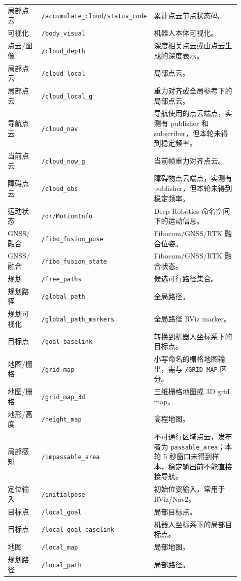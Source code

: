 \documentclass[UTF8,11pt,a4paper]{ctexart}
\begin{document}
{\begin{longtable}{p{0.17\linewidth}p{0.31\linewidth}p{0.43\linewidth}}
局部点云 & \texttt{/accumulate\_cloud/status\_code} & 累计点云节点状态码。\\
可视化 & \texttt{/body\_visual} & 机器人本体可视化。\\
点云/图像 & \texttt{/cloud\_depth} & 深度相关点云或由点云生成的深度表示。\\
局部点云 & \texttt{/cloud\_local} & 局部点云。\\
局部点云 & \texttt{/cloud\_local\_g} & 重力对齐或全局参考下的局部点云。\\
导航点云 & \texttt{/cloud\_nav} & 导航使用的点云端点，实测有 publisher 和 subscriber，但本轮未得到稳定频率。\\
当前点云 & \texttt{/cloud\_now\_g} & 当前帧重力对齐点云。\\
障碍点云 & \texttt{/cloud\_obs} & 障碍物点云端点，实测有 publisher，但本轮未得到稳定频率。\\
运动状态 & \texttt{/dr/MotionInfo} & Deep Robotics 命名空间下的运动信息。\\
GNSS/融合 & \texttt{/fibo\_fusion\_pose} & Fibocom/GNSS/RTK 融合位姿。\\
GNSS/融合 & \texttt{/fibo\_fusion\_state} & Fibocom/GNSS/RTK 融合状态。\\
规划 & \texttt{/free\_paths} & 候选可行路径集合。\\
规划路径 & \texttt{/global\_path} & 全局路径。\\
规划可视化 & \texttt{/global\_path\_markers} & 全局路径 RViz marker。\\
目标点 & \texttt{/goal\_baselink} & 转换到机器人坐标系下的目标点。\\
地图/栅格 & \texttt{/grid\_map} & 小写命名的栅格地图输出，需与 \texttt{/GRID\_MAP} 区分。\\
地图/栅格 & \texttt{/grid\_map\_3d} & 三维栅格地图或 3D grid map。\\
地形/高度 & \texttt{/height\_map} & 高程地图。\\
局部感知 & \texttt{/impassable\_area} & 不可通行区域点云，发布者为 \texttt{passable\_area}；本轮 5 秒窗口未得到样本，稳定输出前不能直接接导航。\\
定位输入 & \texttt{/initialpose} & 初始位姿输入，常用于 RViz/Nav2。\\
目标点 & \texttt{/local\_goal} & 局部目标点。\\
目标点 & \texttt{/local\_goal\_baselink} & 机器人坐标系下的局部目标点。\\
地图 & \texttt{/local\_map} & 局部地图。\\
规划路径 & \texttt{/local\_path} & 局部路径。\\

\end{longtable}}
\end{document}
